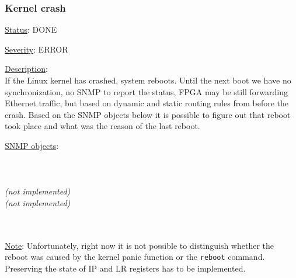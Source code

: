 \subsubsection{\bf Kernel crash}
		\begin{pck_descr}
			\item [] \underline{Status}: DONE
			\item [] \underline{Severity}: ERROR
			\item [] \underline{Description}:\\
				If the Linux kernel has crashed, system reboots. Until the next boot we
				have no synchronization, no SNMP to report the status, FPGA may be still
				forwarding Ethernet traffic, but based on dynamic and static routing
				rules from before the crash. Based on the SNMP objects below it is
				possible to figure out that reboot took place and what was the reason of
				the last reboot.
			\item [] \underline{SNMP objects}:\\
				\\
				\\
				\\
				 \emph{(not implemented)}\\
				 \emph{(not implemented)}\\
				\\
				\\
			\item [] \underline{Note}:
				Unfortunately, right now it is not possible to distinguish whether the
				reboot was caused by the kernel panic function or the \texttt{reboot}
				command. Preserving the state of IP and LR registers has to be
				implemented.
		\end{pck_descr}
